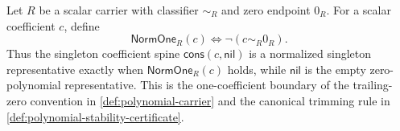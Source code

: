 \begin{definition}
\label{def:polynomial-normalized-singleton-representative}
Let $R$ be a scalar carrier with classifier $\sim_R$ and zero endpoint $0_R$.
For a scalar coefficient $c$, define
$$
\mathsf{NormOne}_R(c)\Longleftrightarrow \neg(c\sim_R0_R).
$$
Thus the singleton coefficient spine $\mathsf{cons}(c,\mathsf{nil})$ is a normalized singleton representative exactly when $\mathsf{NormOne}_R(c)$ holds, while $\mathsf{nil}$ is the empty zero-polynomial representative. This is the one-coefficient boundary of the trailing-zero convention in \autoref{def:polynomial-carrier} and the canonical trimming rule in \autoref{def:polynomial-stability-certificate}.
\end{definition}

